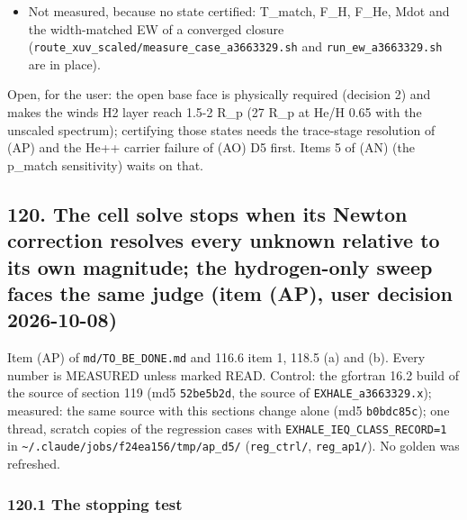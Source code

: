 \documentclass[english,a4paper]{my_memo}
\begin{document}
\begin{itemize}
  1.01e-5, cell 1 x\_H 6.8e-6 and x\_H2 0.4344 against 0.4340 (before, the
  stored state of the oxygen-defect binary: 0.58 and 0.018). On the states
  the solver returned the jump at the face is gone with the open face and
  only with it; route B kept no usable state (its last two pass states
  carry an unconverged hydrodynamic solve). Figure \texttt{LHS1140b/models/.P2/ew\_fit/an\_struct/fig\_matching\_surface\_structural.png},
  tables \texttt{an\_struct\_tables.txt} (script \texttt{an\_structural\_compare.py}).
\item
  Not measured, because no state certified: T\_match, F\_H, F\_He, Mdot and the
  width-matched EW of a converged closure (\texttt{route\_xuv\_scaled/measure\_case\_a3663329.sh}
  and \texttt{run\_ew\_a3663329.sh} are in place).
\end{itemize}

Open, for the user: the open base face is physically required (decision 2)
and makes the wind\textquotesingle s H2 layer reach 1.5-2 R\_p (27 R\_p at He/H 0.65 with the
unscaled spectrum); certifying those states needs the trace-stage resolution
of (AP) and the He++ carrier failure of (AO) D5 first. Items 5 of (AN) (the
p\_match sensitivity) waits on that.

\subsection{120. The cell solve stops when its Newton correction resolves every unknown relative to its own magnitude; the hydrogen-only sweep faces the same judge (item (AP), user decision 2026-10-08)}\label{120-the-cell-solve-stops-when-its-newton-correction-resolves-every-unknown-relative-to-its-own-magnitude-the-hydrogen-only-sweep-faces-the-same-judge-item-ap-user-decision-2026-10-08}

Item (AP) of \texttt{md/TO\_BE\_DONE.md} and 116.6 item 1, 118.5 (a) and (b). Every
number is MEASURED unless marked READ. Control: the gfortran 16.2 build of the
source of section 119 (md5 \texttt{52be5b2d}, the source of \texttt{EXHALE\_a3663329.x});
measured: the same source with this section\textquotesingle s change alone (md5 \texttt{b0bdc85c});
one thread, scratch copies of the regression cases with
\texttt{EXHALE\_IEQ\_CLASS\_RECORD=1} in \texttt{\textasciitilde{}/.claude/jobs/f24ea156/tmp/ap\_d5/}
(\texttt{reg\_ctrl/}, \texttt{reg\_ap1/}). No golden was refreshed.

\subsubsection{120.1 The stopping test}\label{1201-the-stopping-test}
\end{document}
